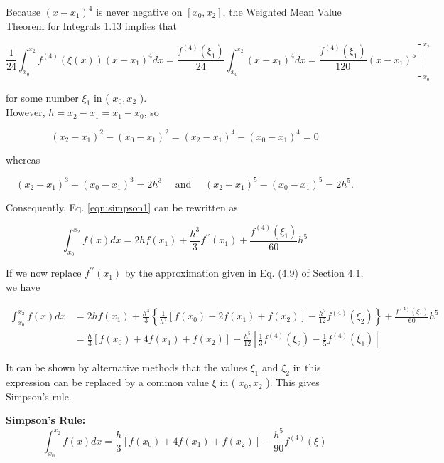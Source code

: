 
Because $\left(x-x_{1}\right)^{4}$ is never negative on $\left[x_{0}, x_{2}\right]$, the Weighted Mean Value Theorem for Integrals 1.13 implies that

$$
\left.\frac{1}{24} \int_{x_{0}}^{x_{2}} f^{(4)}(\xi(x))\left(x-x_{1}\right)^{4} d x=\frac{f^{(4)}\left(\xi_{1}\right)}{24} \int_{x_{0}}^{x_{2}}\left(x-x_{1}\right)^{4} d x=\frac{f^{(4)}\left(\xi_{1}\right)}{120}\left(x-x_{1}\right)^{5}\right]_{x_{0}}^{x_{2}}
$$

for some number $\xi_{1}$ in ( $x_{0}, x_{2}$ ).\\
However, $h=x_{2}-x_{1}=x_{1}-x_{0}$, so

$$
\left(x_{2}-x_{1}\right)^{2}-\left(x_{0}-x_{1}\right)^{2}=\left(x_{2}-x_{1}\right)^{4}-\left(x_{0}-x_{1}\right)^{4}=0
$$

whereas

$$
\left(x_{2}-x_{1}\right)^{3}-\left(x_{0}-x_{1}\right)^{3}=2 h^{3} \quad \text { and } \quad\left(x_{2}-x_{1}\right)^{5}-\left(x_{0}-x_{1}\right)^{5}=2 h^{5} .
$$

Consequently, Eq. \ref{eqn:simpson1} can be rewritten as

$$
\int_{x_{0}}^{x_{2}} f(x) d x=2 h f\left(x_{1}\right)+\frac{h^{3}}{3} f^{\prime \prime}\left(x_{1}\right)+\frac{f^{(4)}\left(\xi_{1}\right)}{60} h^{5}
$$

If we now replace $f^{\prime \prime}\left(x_{1}\right)$ by the approximation given in Eq. (4.9) of Section 4.1, we have

$$
\begin{aligned}
\int_{x_{0}}^{x_{2}} f(x) d x & =2 h f\left(x_{1}\right)+\frac{h^{3}}{3}\left\{\frac{1}{h^{2}}\left[f\left(x_{0}\right)-2 f\left(x_{1}\right)+f\left(x_{2}\right)\right]-\frac{h^{2}}{12} f^{(4)}\left(\xi_{2}\right)\right\}+\frac{f^{(4)}\left(\xi_{1}\right)}{60} h^{5} \\
& =\frac{h}{3}\left[f\left(x_{0}\right)+4 f\left(x_{1}\right)+f\left(x_{2}\right)\right]-\frac{h^{5}}{12}\left[\frac{1}{3} f^{(4)}\left(\xi_{2}\right)-\frac{1}{5} f^{(4)}\left(\xi_{1}\right)\right]
\end{aligned}
$$

It can be shown by alternative methods that the values $\xi_{1}$ and $\xi_{2}$ in this expression can be replaced by a common value $\xi$ in ( $x_{0}, x_{2}$ ). This gives Simpson's rule.
\begin{boxB}
{\bf Simpson's Rule:}
$$
\int_{x_{0}}^{x_{2}} f(x) d x=\frac{h}{3}\left[f\left(x_{0}\right)+4 f\left(x_{1}\right)+f\left(x_{2}\right)\right]-\frac{h^{5}}{90} f^{(4)}(\xi)
$$
\end{boxB}

